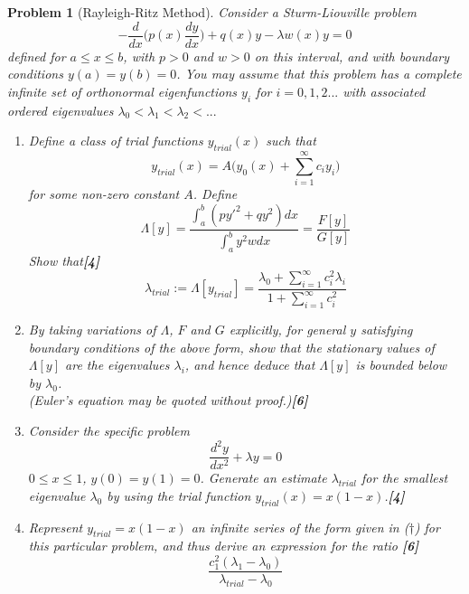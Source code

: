 \documentclass[a4paper]{article}
\theoremstyle{new}
\newtheorem{qns}{Problem}[section]
\begin{document}
\begin{qns}[Rayleigh-Ritz Method]
Consider a Sturm-Liouville problem
$$-\frac{d}{dx}\bigg(p(x)\frac{dy}{dx}\bigg)+q(x)y-\lambda w(x)y=0$$
defined for $a\leq x\leq b$, with $p>0$ and $w>0$ on this interval, and with boundary conditions $y(a)=y(b)=0$. You may assume that this problem has a complete infinite set of orthonormal eigenfunctions $y_i$ for $i=0,1,2...$ with associated ordered eigenvalues $\lambda_0<\lambda_1<\lambda_2<...$
\begin{enumerate}[label=(\alph*)]
    \item Define a class of trial functions $y_{trial}(x)$ such that
\begin{equation}
y_{trial}(x)=A\bigg(y_0(x)+\sum_{i=1}^\infty c_iy_i\bigg)\tag{\dag}
\end{equation}
for some non-zero constant $A$. Define
$$\Lambda[y]=\frac{\int_a^b(py'^2+qy^2)dx}{\int_a^by^2wdx}=\frac{F[y]}{G[y]}$$
Show that\hfill \textbf{[4]}
\begin{equation}
\lambda_{trial}:=\Lambda[y_{trial}]=\frac{\lambda_0+\sum_{i=1}^\infty c_i^2\lambda_i}{1+\sum_{i=1}^\infty c_i^2}\tag{*}
\end{equation}
\item By taking variations of $\Lambda$, $F$ and $G$ explicitly, for general $y$ satisfying boundary conditions of the above form, show that the stationary values of $\Lambda[y]$ are the eigenvalues $\lambda_i$, and hence deduce that $\Lambda[y]$ is bounded below by $\lambda_0$.\\[5pt](Euler's equation may be quoted without proof.)\hfill\textbf{[6]}
\item Consider the specific problem
$$\frac{d^2y}{dx^2}+\lambda y=0$$
$0\leq x\leq 1$, $y(0)=y(1)=0$. Generate an estimate $\lambda_{trial}$ for the smallest eigenvalue $\lambda_0$ by using the trial function $y_{trial}(x)=x(1-x)$.\hfill \textbf{[4]}
\item Represent $y_{trial}=x(1-x)$ an infinite series of the form given in ($\dag$) for this particular problem, and thus derive an expression for the ratio \hfill \textbf{[6]}
$$\frac{c_1^2(\lambda_1-\lambda_0)}{\lambda_{trial}-\lambda_0}$$
\end{enumerate}
\end{qns}
\newpage
\end{document}
